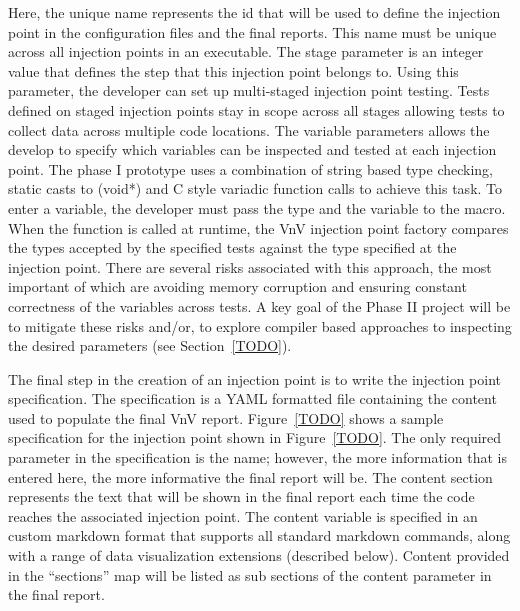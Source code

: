 Here, the unique name represents the id that will be used to define the injection point in the configuration files and the final reports. This name must 
be unique across all injection points in an executable. The stage parameter is an integer value that defines the step that this injection point belongs to. Using this parameter, the developer can set up multi-staged injection point testing. Tests defined on staged injection points stay in scope across 
all stages allowing tests to collect data across multiple code locations. The variable parameters allows the develop to specify which variables can be inspected and tested at each injection point. The phase I prototype uses a combination of string based type checking, static casts to (void*) and C style variadic function calls to achieve this task. To enter a variable, the developer must pass the type and the variable to the macro. When the function is called at runtime, the VnV injection point factory compares the types accepted by the specified tests against the type specified at the injection point. There are several risks associated with this approach, the most important of which are avoiding memory corruption and ensuring constant correctness of the variables across tests. A key goal of the Phase II project will be to mitigate these risks and/or, to explore compiler based approaches to inspecting the desired parameters (see Section~\ref{TODO}).


The final step in the creation of an injection point is to write the injection point specification. The specification is a YAML formatted 
file containing the content used to populate the final VnV report. Figure~\ref{TODO} shows a sample specification for the 
injection point shown in Figure~\ref{TODO}. The only required parameter in the specification is the name; however, the more information that is entered here, the more informative the final report will be. The content section represents the text that will be shown in the final report each time the code reaches the associated injection point. The content variable is specified  in an custom markdown format that supports all standard markdown commands, along with a range of data visualization extensions (described below). Content provided in the ``sections'' map will be listed as sub sections of the content parameter in the final report. 

